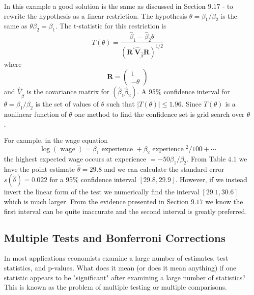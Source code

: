 \documentclass[10pt]{article}
\begin{document}
In this example a good solution is the same as discussed in Section $9.17$ - to rewrite the hypothesis as a linear restriction. The hypothesis $\theta=\beta_{1} / \beta_{2}$ is the same as $\theta \beta_{2}=\beta_{1}$. The t-statistic for this restriction is
$$
T(\theta)=\frac{\widehat{\beta}_{1}-\widehat{\beta}_{2} \theta}{\left(\boldsymbol{R}^{\prime} \widehat{\boldsymbol{V}}_{\widehat{\beta}} \boldsymbol{R}\right)^{1 / 2}}
$$
where
$$
\boldsymbol{R}=\left(\begin{array}{c}
1 \\
-\theta
\end{array}\right)
$$
and $\widehat{V}_{\widehat{\beta}}$ is the covariance matrix for $\left(\widehat{\beta}_{1} \widehat{\beta}_{2}\right)$. A 95\% confidence interval for $\theta=\beta_{1} / \beta_{2}$ is the set of values of $\theta$ such that $|T(\theta)| \leq 1.96$. Since $T(\theta)$ is a nonlinear function of $\theta$ one method to find the confidence set is grid search over $\theta$.

For example, in the wage equation
$$
\log (\text { wage })=\beta_{1} \text { experience }+\beta_{2} \text { experience }^{2} / 100+\cdots
$$
the highest expected wage occurs at experience $=-50 \beta_{1} / \beta_{2}$. From Table $4.1$ we have the point estimate $\widehat{\theta}=29.8$ and we can calculate the standard error $s(\widehat{\theta})=0.022$ for a 95\% confidence interval $[29.8,29.9]$. However, if we instead invert the linear form of the test we numerically find the interval $[29.1,30.6]$ which is much larger. From the evidence presented in Section $9.17$ we know the first interval can be quite inaccurate and the second interval is greatly preferred.

\subsection{Multiple Tests and Bonferroni Corrections}
In most applications economists examine a large number of estimates, test statistics, and p-values. What does it mean (or does it mean anything) if one statistic appears to be "significant" after examining a large number of statistics? This is known as the problem of multiple testing or multiple comparisons.
\end{document}
